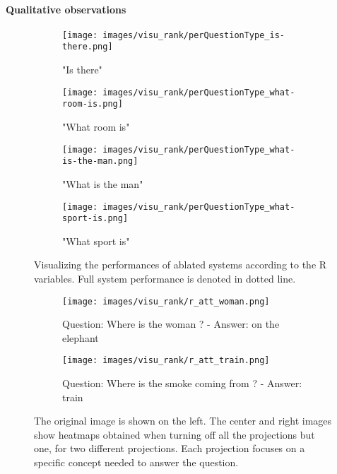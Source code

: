 \documentclass[10pt,twocolumn,letterpaper]{article}
\begin{document}
\paragraph{Qualitative observations}

\begin{figure}
\centering
\begin{subfigure}{0.49\linewidth}
\texttt{[image: images/visu\_rank/perQuestionType\_is-there.png]}
\caption{"Is there"}
\end{subfigure}
\begin{subfigure}{0.49\linewidth}
\texttt{[image: images/visu\_rank/perQuestionType\_what-room-is.png]}
\caption{"What room is"}
\end{subfigure}

\begin{subfigure}{0.49\linewidth}
\texttt{[image: images/visu\_rank/perQuestionType\_what-is-the-man.png]}
\caption{"What is the man"}
\end{subfigure}
\begin{subfigure}{0.49\linewidth}
\texttt{[image: images/visu\_rank/perQuestionType\_what-sport-is.png]}
\caption{"What sport is"}
\end{subfigure}
\caption{\label{rank_barplot} Visualizing the performances of ablated systems according to the R variables. Full system performance is denoted in dotted line.}
\end{figure}


\begin{figure}[]
\begin{subfigure}{\columnwidth}
\texttt{[image: images/visu\_rank/r\_att\_woman.png]}
\caption{Question: Where is the woman ? - Answer: on the elephant}
\end{subfigure}
\begin{subfigure}{\columnwidth}
\texttt{[image: images/visu\_rank/r\_att\_train.png]}
\caption{Question: Where is the smoke coming from ? - Answer: train}
\end{subfigure}
\caption{\label{r_attention}The original image is shown on the left. The center and right images show heatmaps obtained when turning off all the projections but one, for two different projections. Each projection focuses on a specific concept needed to answer the question.}
\end{figure}
\end{document}
